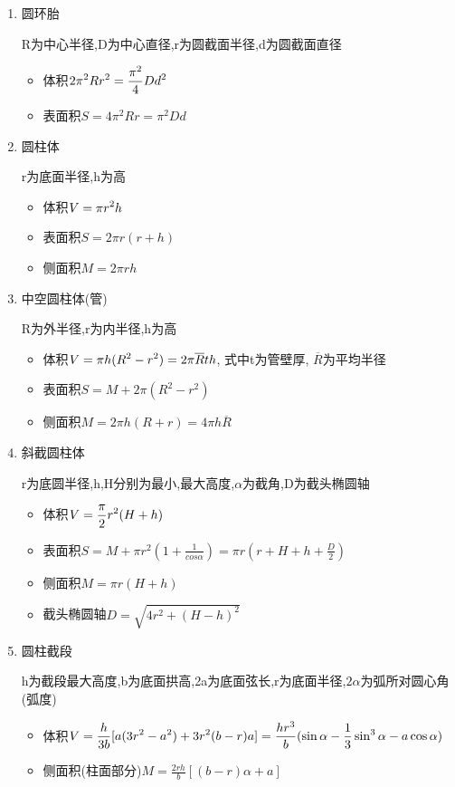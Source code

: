 \begin{enumerate}
	\item 圆环胎
	
	R为中心半径,D为中心直径,r为圆截面半径,d为圆截面直径
	\begin{itemize}
		\item 体积$\displaystyle 2\pi^2 Rr^2 = \frac{\pi^2}{4}Dd^2$
		\item 表面积$S = 4\pi^2Rr = \pi^2Dd$
	\end{itemize}
	
	\item 圆柱体
	
	r为底面半径,h为高
	\begin{itemize}
		\item 体积$\displaystyle V = \pi r^2h$
		\item 表面积$S = 2\pi r(r+h)$
		\item 侧面积$M = 2\pi rh$
	\end{itemize}
	
	\item 中空圆柱体(管)
	
	R为外半径,r为内半径,h为高
	\begin{itemize}
		\item 体积$\displaystyle V = \pi h(R^2 - r^2) = 2\pi \overline{R} th$, 式中t为管壁厚, $\overline{R}$为平均半径
		\item 表面积$S = M + 2\pi (R^2 - r^2)$
		\item 侧面积$M = 2\pi h(R+r) = 4\pi h \overline{R}$
	\end{itemize}
	
	\item 斜截圆柱体
	
	r为底圆半径,h,H分别为最小,最大高度,$\alpha$为截角,D为截头椭圆轴
	\begin{itemize}
		\item 体积$\displaystyle V = \frac{\pi}{2}r^2(H+h)$
		\item 表面积$S = M + \pi r^2(1 + \frac{1}{cos{\alpha}}) = \pi r (r + H + h + \frac{D}{2})$
		\item 侧面积$M = \pi r(H + h)$
		\item 截头椭圆轴$D = \sqrt{4r^2 + (H-h)^2}$
	\end{itemize}
	
	\item 圆柱截段
	
	h为截段最大高度,b为底面拱高,2a为底面弦长,r为底面半径,$2\alpha$为弧所对圆心角(弧度)
	\begin{itemize}
		\item 体积$\displaystyle V = \frac{h}{3b}[a(3r^2 - a^2) + 3r^2(b - r)a] = \frac{hr^3}{b}(\sin{\alpha} - \frac{1}{3}\sin^3{\alpha}-a\cos{\alpha})$
		\item 侧面积(柱面部分)$M = \frac{2rh}{b}[(b-r)\alpha + a]$
	\end{itemize}
	

\end{enumerate}
